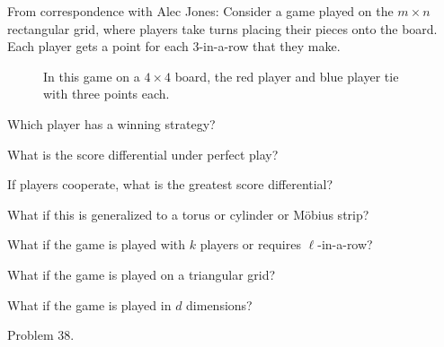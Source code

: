 \documentclass{article}
\begin{document}
  From correspondence with Alec Jones: Consider a game played on the
  $m \times n$ rectangular grid, where players take turns placing their pieces
  onto the board. Each player gets a point for each 3-in-a-row that they make.
  \begin{figure}[!h]
    \centering
    \caption{
      In this game on a $4 \times 4$ board, the red player and blue player tie with three points each.
    }
  \end{figure}

\begin{question}
  Which player has a winning strategy?
\end{question}
\begin{related}
  \item What is the score differential under perfect play?
  \item If players cooperate, what is the greatest score differential?
  \item What if this is generalized to a torus or cylinder or M\"obius strip?
  \item What if the game is played with $k$ players or requires $\ell$-in-a-row?
  \item What if the game is played on a triangular grid?
  \item What if the game is played in $d$ dimensions?
\end{related}
\begin{references}
  \item Problem 38.
\end{references}
\end{document}
